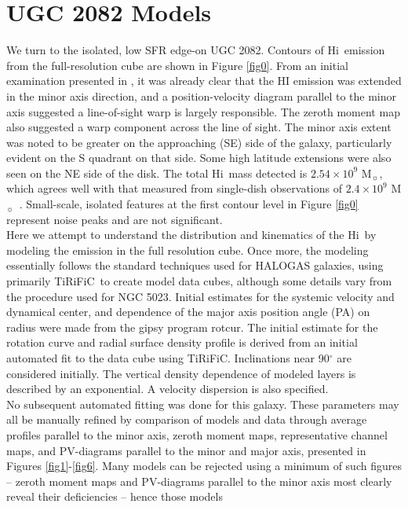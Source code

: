 \documentclass[useAMS,usenatbib]{mn2e}
\newcommand{\msun}{M$_{\sun}$}
\newcommand\tiri{{\sc TiRiFiC}}
\newcommand\HI{H{\sc i}}
\begin{document}
\section{UGC 2082 Models} \label{ModelsU2082}
We turn to the isolated, low SFR edge-on UGC 2082. Contours of \HI\ emission from the full-resolution cube are 
shown in Figure \ref{fig0}. From an initial examination presented in \cite{2011A&A...526A.118H}, it was already clear that the HI emission was extended in the
minor axis direction, and a position-velocity diagram parallel to the
minor axis suggested a line-of-sight warp is largely
responsible.  The zeroth moment map also suggested a warp component
across the line of sight.  The minor axis extent was noted to be
greater on the approaching (SE) side of the galaxy, particularly
evident on the S quadrant on that side.  Some high latitude extensions
were also seen on the NE side of the disk. The total \HI\  mass detected is $2.54 \times 10^9$ \msun, which agrees well
with that measured from single-dish observations of $2.4 \times 10^9$
\msun\  \citep{2005ApJS..160..149S}.  Small-scale, isolated features at the first contour level in Figure \ref{fig0} represent noise peaks and are not significant.\\
\indent Here we attempt to understand the distribution and kinematics of the
\HI\ by modeling the emission in the full resolution cube. Once more, the modeling
essentially follows the standard techniques used for HALOGAS galaxies,
using primarily \tiri\ to create
model data cubes, although some details vary from the procedure used for NGC 5023.  Initial estimates for the systemic velocity and
dynamical center, and dependence of the major axis position angle (PA)
on radius were made from the {\sc gipsy} program {\sc rotcur}.  The initial estimate for the rotation curve and radial
surface density profile is derived from an initial automated fit to
the data cube using \tiri.  Inclinations near 90$^{\circ}$ are
considered initially.  The vertical density dependence of modeled
layers is described by an exponential.  A velocity dispersion is also
specified.\\
\indent No subsequent automated fitting was
done for this galaxy.  These parameters may all be manually refined by comparison of models
and data through average profiles parallel to the minor axis, zeroth
moment maps, representative channel maps, and PV-diagrams parallel to the minor and major axis,
presented in Figures \ref{fig1}-\ref{fig6}.  Many models can be
rejected using a minimum of such figures -- zeroth moment maps and PV-diagrams parallel to the minor axis most clearly reveal their deficiencies -- hence those models
\end{document}
